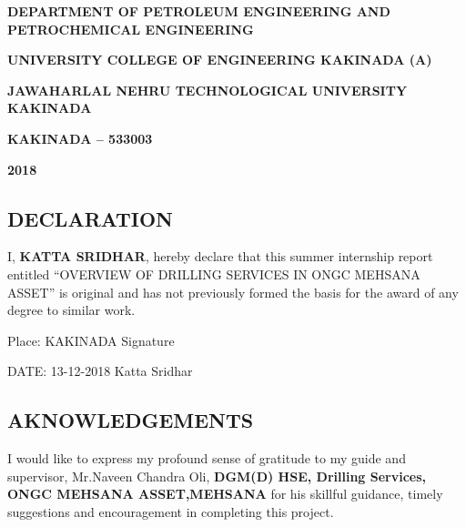\documentclass[11pt,a4paper]{report}
\begin{document}
\begin{titlepage}
\begin{center}
\vspace{1em}

\doublespacing

\large \textbf{DEPARTMENT OF PETROLEUM ENGINEERING AND \\ 
PETROCHEMICAL ENGINEERING}

\large \textbf{UNIVERSITY COLLEGE OF ENGINEERING KAKINADA (A)}

\large \textbf{JAWAHARLAL NEHRU TECHNOLOGICAL UNIVERSITY KAKINADA}

\large \textbf{KAKINADA – 533003}

\large \textbf{2018}

\end{center}
\end{titlepage}

\newpage

\begin{center}
\section*{DECLARATION}
\end{center}

\vspace{4em}


I, \textbf{KATTA SRIDHAR}, hereby declare that this summer internship report entitled “OVERVIEW OF DRILLING SERVICES IN ONGC MEHSANA ASSET” is original and has not previously formed the basis for the award of any degree to similar work.


\vspace{5em}

\noindent Place: KAKINADA  \hfill Signature     \hspace{0.02\textwidth}

\vspace{1em}

\noindent DATE: 13-12-2018  \hfill Katta Sridhar


\newpage

\begin{center}
\section*{AKNOWLEDGEMENTS}
\end{center}


\vspace{1em}

I would like to express my profound sense of gratitude to my guide and supervisor, Mr.Naveen Chandra Oli, \textbf{DGM(D) HSE, Drilling Services, ONGC MEHSANA ASSET,MEHSANA} for his skillful guidance, timely suggestions and encouragement in completing this project.
\end{document}
